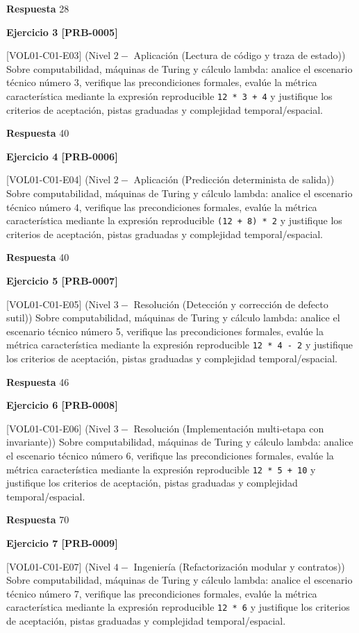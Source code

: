 \documentclass{book}
\begin{document}
\noindent\textbf{Respuesta} 28

\noindent\textbf{Ejercicio 3 [PRB-0005]}

[VOL01-C01-E03] (Nivel \(2 -\) Aplicación (Lectura de código y traza de estado)) Sobre computabilidad, máquinas de Turing y cálculo lambda: analice el escenario técnico número 3, verifique las precondiciones formales, evalúe la métrica característica mediante la expresión reproducible \texttt{12 * 3 + 4} y justifique los criterios de aceptación, pistas graduadas y complejidad temporal/espacial.

\noindent\textbf{Respuesta} 40

\noindent\textbf{Ejercicio 4 [PRB-0006]}

[VOL01-C01-E04] (Nivel \(2 -\) Aplicación (Predicción determinista de salida)) Sobre computabilidad, máquinas de Turing y cálculo lambda: analice el escenario técnico número 4, verifique las precondiciones formales, evalúe la métrica característica mediante la expresión reproducible \texttt{(12 + 8) * 2} y justifique los criterios de aceptación, pistas graduadas y complejidad temporal/espacial.

\noindent\textbf{Respuesta} 40

\noindent\textbf{Ejercicio 5 [PRB-0007]}

[VOL01-C01-E05] (Nivel \(3 -\) Resolución (Detección y corrección de defecto sutil)) Sobre computabilidad, máquinas de Turing y cálculo lambda: analice el escenario técnico número 5, verifique las precondiciones formales, evalúe la métrica característica mediante la expresión reproducible \texttt{12 * 4 - 2} y justifique los criterios de aceptación, pistas graduadas y complejidad temporal/espacial.

\noindent\textbf{Respuesta} 46

\noindent\textbf{Ejercicio 6 [PRB-0008]}

[VOL01-C01-E06] (Nivel \(3 -\) Resolución (Implementación multi-etapa con invariante)) Sobre computabilidad, máquinas de Turing y cálculo lambda: analice el escenario técnico número 6, verifique las precondiciones formales, evalúe la métrica característica mediante la expresión reproducible \texttt{12 * 5 + 10} y justifique los criterios de aceptación, pistas graduadas y complejidad temporal/espacial.

\noindent\textbf{Respuesta} 70

\noindent\textbf{Ejercicio 7 [PRB-0009]}

[VOL01-C01-E07] (Nivel \(4 -\) Ingeniería (Refactorización modular y contratos)) Sobre computabilidad, máquinas de Turing y cálculo lambda: analice el escenario técnico número 7, verifique las precondiciones formales, evalúe la métrica característica mediante la expresión reproducible \texttt{12 * 6} y justifique los criterios de aceptación, pistas graduadas y complejidad temporal/espacial.
\end{document}
